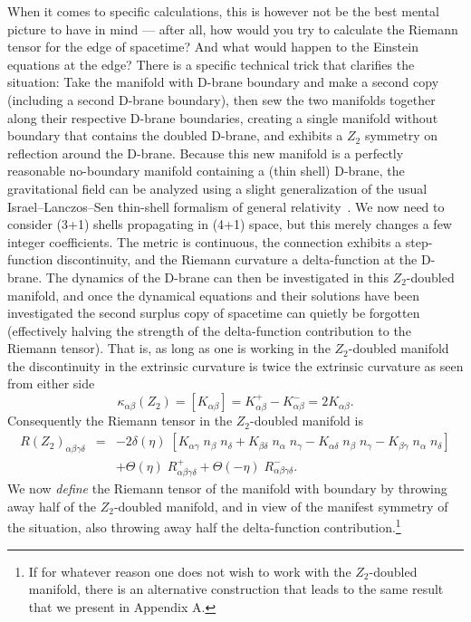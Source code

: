 \documentclass[a4paper,12pt]{article}
\begin{document}
When it comes to specific calculations, this is however not be the
best mental picture to have in mind --- after all, how would you try
to calculate the Riemann tensor for the edge of spacetime? And what
would happen to the Einstein equations at the edge? There is a
specific technical trick that clarifies the situation: Take the
manifold with D-brane boundary and make a second copy (including a
second D-brane boundary), then sew the two manifolds together along
their respective D-brane boundaries, creating a single manifold
without boundary that contains the doubled D-brane, and exhibits a
$Z_2$ symmetry on reflection around the D-brane. Because this new
manifold is a perfectly reasonable no-boundary manifold containing a
(thin shell) D-brane, the gravitational field can be analyzed using a
slight generalization of the usual Israel--Lanczos--Sen thin-shell
formalism of general relativity~\cite{Israel,Lanczos,Sen}. We now need
to consider (3+1) shells propagating in (4+1) space, but this merely
changes a few integer coefficients. The metric is continuous, the
connection exhibits a step-function discontinuity, and the Riemann
curvature a delta-function at the D-brane. The dynamics of the D-brane
can then be investigated in this $Z_2$-doubled manifold, and once the
dynamical equations and their solutions have been investigated the
second surplus copy of spacetime can quietly be forgotten (effectively
halving the strength of the delta-function contribution to the Riemann
tensor). That is, as long as one is working in the $Z_2$-doubled
manifold the discontinuity in the extrinsic curvature is twice the
extrinsic curvature as seen from either side
%
\begin{equation}
\kappa_{\alpha\beta}(Z_2) = [K_{\alpha\beta}] = 
K^+_{\alpha\beta} - K^-_{\alpha\beta} = 2 K_{\alpha\beta}.
\end{equation}
% 
Consequently the Riemann tensor in the $Z_2$-doubled manifold is
%
\begin{eqnarray}
R(Z_2)_{\alpha\beta\gamma\delta} &=& 
- 2 \delta(\eta) \; \left[
K_{\alpha\gamma} \; n_\beta \; n_\delta + 
K_{\beta\delta} \; n_\alpha \; n_\gamma -
K_{\alpha\delta} \; n_\beta \; n_\gamma -
K_{\beta\gamma} \; n_\alpha \; n_\delta
\right] 
\nonumber\\
&&
+\Theta(\eta) \; R^+_{\alpha\beta\gamma\delta}
+\Theta(-\eta) \; R^-_{\alpha\beta\gamma\delta}.
\end{eqnarray}
%
We now {\em define} the Riemann tensor of the manifold with boundary
by throwing away half of the $Z_2$-doubled manifold, and in view of
the manifest symmetry of the situation, also throwing away half the
delta-function contribution.\footnote{
If for whatever reason one does not wish to work with the
$Z_2$-doubled manifold, there is an alternative construction that
leads to the same result that we present in Appendix A.}
\end{document}
